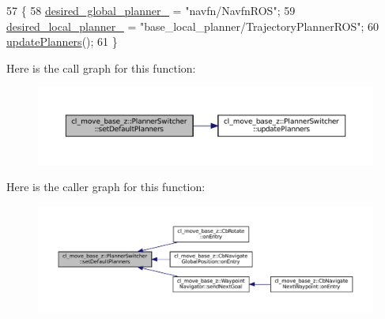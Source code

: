 \begin{DoxyCode}
57 \{
58   \hyperlink{classcl__move__base__z_1_1PlannerSwitcher_aef047d3778b2993c1df146bbad43e03d}{desired\_global\_planner\_} = \textcolor{stringliteral}{"navfn/NavfnROS"};
59   \hyperlink{classcl__move__base__z_1_1PlannerSwitcher_a6cbf65f11bb69125f913caaabdf7b4cf}{desired\_local\_planner\_} = \textcolor{stringliteral}{"base\_local\_planner/TrajectoryPlannerROS"};
60   \hyperlink{classcl__move__base__z_1_1PlannerSwitcher_a146641f63aea3185daab4c5cbb789550}{updatePlanners}();
61 \}
\end{DoxyCode}
Here is the call graph for this function\+:
\nopagebreak
\begin{figure}[H]
\begin{center}
\leavevmode
\includegraphics[width=350pt]{classcl__move__base__z_1_1PlannerSwitcher_ad3f0d08a51af6218d203bf44a7f9df40_cgraph}
\end{center}
\end{figure}
Here is the caller graph for this function\+:
\nopagebreak
\begin{figure}[H]
\begin{center}
\leavevmode
\includegraphics[width=350pt]{classcl__move__base__z_1_1PlannerSwitcher_ad3f0d08a51af6218d203bf44a7f9df40_icgraph}
\end{center}
\end{figure}
\mbox{\label{classcl__move__base__z_1_1PlannerSwitcher_a4bec9859c90f125f9fcc2b68594caf17}} 
